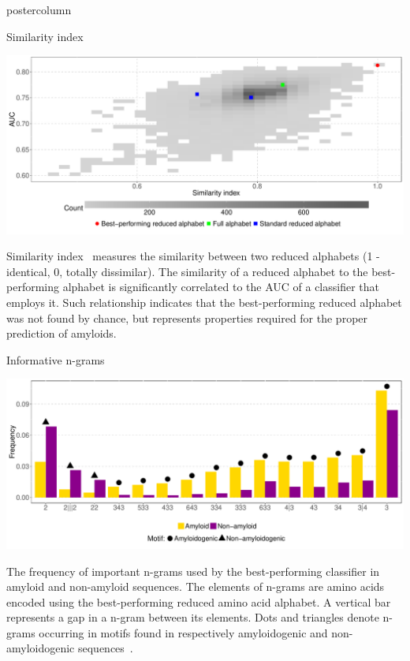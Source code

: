 \documentclass[final]{beamer}\usepackage[]{graphicx}\usepackage[]{color}
\makeatletter
\def\maxwidth{ %
  \ifdim\Gin@nat@width>\linewidth
    \linewidth
  \else
    \Gin@nat@width
  \fi
}
\newenvironment{knitrout}{}{} %
\makeatother
\begin{document}
\begin{frame}
\begin{columns}
\begin{column}{.51\textwidth}
\begin{beamercolorbox}[center,wd=\textwidth]{postercolumn}
\begin{minipage}[T]{.95\textwidth}
{\begin{block}{Similarity index}
\begin{knitrout}
{\centering \includegraphics[width=\maxwidth]{figure/unnamed-chunk-2-1} 

}



\end{knitrout}
Similarity index~\citep{stephenson_unearthing_2013} measures the similarity between two reduced alphabets (1 - identical, 0, totally dissimilar). The similarity of a reduced alphabet to the best-performing alphabet is significantly correlated to the AUC of a classifier that employs it. Such relationship indicates that the best-performing reduced alphabet was not found by chance, but represents properties required for the proper prediction of amyloids. 

\end{block}
\vfill




\begin{block}{Informative n-grams}
\begin{knitrout}
\color{fgcolor}

{\centering \includegraphics[width=\maxwidth]{figure/unnamed-chunk-3-1} 

}



\end{knitrout}

The frequency of important n-grams used by the best-performing 
classifier in amyloid and non-amyloid sequences. The elements of n-grams are 
amino acids encoded using the best-performing reduced amino acid alphabet. 
A vertical bar represents a gap in a n-gram between 
its elements. Dots and triangles 
denote n-grams occurring in motifs found in respectively amyloidogenic and 
non-amyloidogenic sequences~\citep{paz_sequence_2004}.


\end{block}}
\end{minipage}
\end{beamercolorbox}
\end{column}
\end{columns}
\end{frame}
\end{document}
